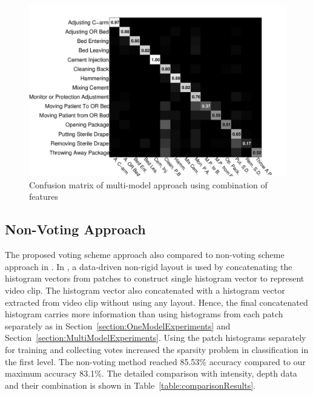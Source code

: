 \begin{figure}[H]%
\begin{center}
\includegraphics[scale=0.4]{Figures/comb-multimodel}
\end{center}
\caption{Confusion matrix of multi-model approach using combination of features  
\label{fig:combinationMultiModelConfusionMatrix}}
\end{figure}
            
            
            
\subsection{Non-Voting Approach}
\label{section:NonVotingAproachExperiments}
	The proposed voting scheme approach also compared to non-voting scheme approach in \cite{twinanda2015data}. In \cite{twinanda2015data}, a data-driven non-rigid layout is used by concatenating the histogram vectors from patches to construct single histogram vector to represent video clip. The histogram vector also concatenated with a histogram vector extracted from video clip without using any layout. Hence, the final concatenated histogram carries more information than using histograms from each patch separately as in Section~\ref{section:OneModelExperiments} and Section~\ref{section:MultiModelExperiments}. Using the patch histograms separately for training and collecting votes increased the sparsity problem in classification in the first level. The non-voting method reached 85.53\% accuracy compared to our maximum accuracy 83.1\%. The detailed comparison with intensity, depth data and their combination is shown in Table~\ref{table:comparisonResults}.
    
